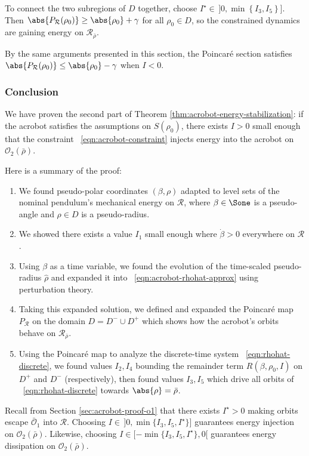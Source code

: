 To connect the two subregions of \(D\) together, choose
\(I^\star \in\, ]0,\min\left\{I_3,I_5\right\}]\).
Then \(\abs{P_\mathcal{R}(\rho_0)} \geq \abs{\rho_0} + \gamma\) for all
\(\rho_0 \in D\), so the constrained dynamics are gaining energy on 
\(\mathcal{R}_{\bar{\rho}}\).

By the same arguments presented in this section, the Poincar\'{e} section
satisfies 
\(\abs{P_\mathcal{R}(\rho_0)} \leq \abs{\rho_0} - \gamma\)
when \(I < 0\).

\subsubsection*{Conclusion}
We have proven the second part of Theorem
\ref{thm:acrobot-energy-stabilization}: if the acrobot satisfies the assumptions
on \(S(\rho_0)\), there exists \(I > 0\) small enough that the constraint
~\eqref{eqn:acrobot-constraint} injects energy into the acrobot on
\(\mathcal{O}_2(\bar{\rho})\).

Here is a summary of the proof:
\begin{enumerate}
    \item We found pseudo-polar coordinates \((\beta,\rho)\) adapted to level
        sets of the nominal pendulum's mechanical energy on \(\mathcal{R}\),
        where \(\beta \in \Sone\) is a pseudo-angle and
        \(\rho \in D\) is a pseudo-radius.
    \item We showed there exists a value \(I_1\) small enough where
        \(\dot{\beta} > 0\) everywhere on \(\mathcal{R}\).
    \item Using \(\beta\) as a time variable, we found the evolution of the
        time-scaled pseudo-radius \(\hat{\rho}\) and expanded it into
        ~\eqref{eqn:acrobot-rhohat-approx} using perturbation theory.
    \item Taking this expanded solution, we defined and expanded the
        Poincar\'{e} map \(P_\mathcal{R}\) on the domain 
        \(D = D^- \cup D^+\) which shows how the acrobot's orbits behave on
        \(\mathcal{R}_{\bar{\rho}}\).
    \item Using the Poincar\'{e} map to analyze the discrete-time system
        ~\eqref{eqn:rhohat-discrete}, we found values \(I_2,I_4\) bounding the
        remainder term \(R(\beta,\rho_0,I)\) on \(D^+\) and \(D^-\)
        (respectively), then found values \(I_3, I_5\) which drive all orbits of
        ~\eqref{eqn:rhohat-discrete} towards \(\abs{\rho} = \bar{\rho}\).
\end{enumerate}
Recall from Section \ref{sec:acrobot-proof-o1} that there exists \(I^\star > 0\)
making orbits escape \(\bar{\mathcal{O}}_1\) into 
\(\mathcal{R}\). 
Choosing \(I \in \,]0,\min\{I_3,I_5,I^\star\}]\)
guarantees energy injection on \(\mathcal{O}_2(\bar{\rho})\).
Likewise, choosing \(I \in [-\min\{I_3,I_5,I^\star\},0[\) guarantees energy
dissipation on \(\mathcal{O}_2(\bar{\rho})\).

